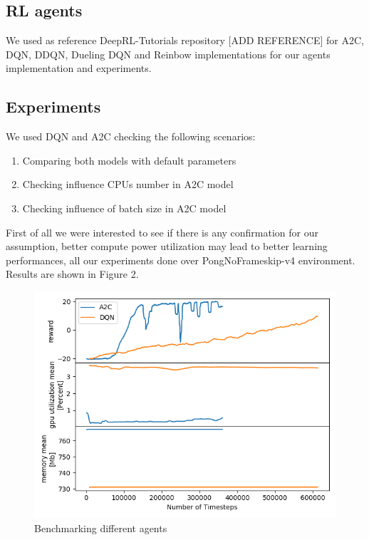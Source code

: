 \documentclass[11 pt, twocolumn]{article}
\begin{document}
\subsection{RL agents}
We used as reference DeepRL-Tutorials repository [ADD REFERENCE] for A2C, DQN, DDQN, Dueling DQN and Reinbow implementations for our agents implementation and experiments.

\subsection{Experiments}
We used DQN and A2C checking the following scenarios:
\begin{enumerate}
\item Comparing both models with default parameters
\item Checking influence CPUs number in A2C model
\item Checking influence of batch size in A2C model
\end{enumerate}
First of all we were interested to see if there is any confirmation for our assumption, better compute power utilization may lead to better learning performances, all our experiments done over PongNoFrameskip-v4 environment. Results are shown in Figure 2.
\begin{figure}
\centering
\includegraphics[width=0.93\columnwidth]{2c_32b.png}
\caption{Benchmarking different agents}
\vspace*{2pt}
\end{figure}
\end{document}
